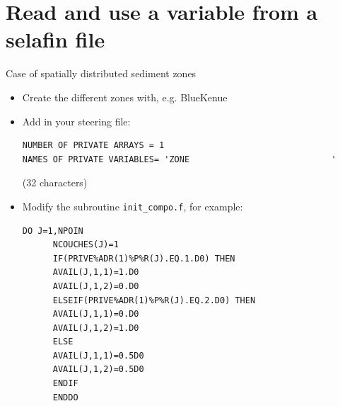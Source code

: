 \section{Read and use a variable from a selafin file}
Case of spatially distributed sediment zones

\begin{itemize}
\item Create the different zones with, e.g. BlueKenue
\item Add in your steering file:
  \begin{lstlisting}[frame=trBL]
NUMBER OF PRIVATE ARRAYS = 1
NAMES OF PRIVATE VARIABLES= 'ZONE                            '
\end{lstlisting}
(32 characters)%
\item Modify the subroutine \texttt{init\_compo.f}, for example:
\begin{lstlisting}[frame=trBL]
      DO J=1,NPOIN
      NCOUCHES(J)=1
	  IF(PRIVE%ADR(1)%P%R(J).EQ.1.D0) THEN
	  AVAIL(J,1,1)=1.D0
	  AVAIL(J,1,2)=0.D0
	  ELSEIF(PRIVE%ADR(1)%P%R(J).EQ.2.D0) THEN
	  AVAIL(J,1,1)=0.D0
	  AVAIL(J,1,2)=1.D0	 
	  ELSE 
	  AVAIL(J,1,1)=0.5D0
	  AVAIL(J,1,2)=0.5D0
	  ENDIF
      ENDDO
\end{lstlisting}
\end{itemize}




